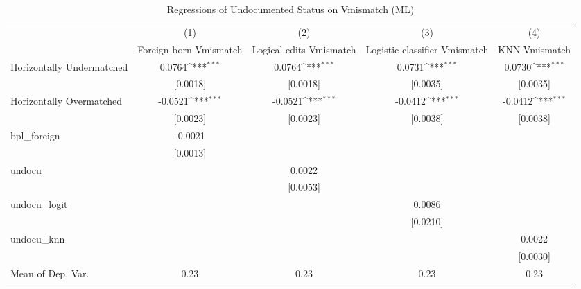 \begin{table}[htbp]\centering
\def\sym#1{\ifmmode^{#1}\else\(^{#1}\)\fi}
\caption{Regressions of Undocumented Status on Vmismatch (ML)}
\begin{tabular}{l*{4}{c}}
\toprule
                    &\multicolumn{1}{c}{(1)}         &\multicolumn{1}{c}{(2)}         &\multicolumn{1}{c}{(3)}         &\multicolumn{1}{c}{(4)}         \\
                    &Foreign-born Vmismatch         &Logical edits Vmismatch         &Logistic classifier Vmismatch         &KNN Vmismatch         \\
\midrule
Horizontally Undermatched&      0.0764\sym{***}&      0.0764\sym{***}&      0.0731\sym{***}&      0.0730\sym{***}\\
                    &    [0.0018]         &    [0.0018]         &    [0.0035]         &    [0.0035]         \\
\addlinespace
Horizontally Overmatched&     -0.0521\sym{***}&     -0.0521\sym{***}&     -0.0412\sym{***}&     -0.0412\sym{***}\\
                    &    [0.0023]         &    [0.0023]         &    [0.0038]         &    [0.0038]         \\
\addlinespace
bpl\_foreign         &     -0.0021         &                     &                     &                     \\
                    &    [0.0013]         &                     &                     &                     \\
\addlinespace
undocu              &                     &      0.0022         &                     &                     \\
                    &                     &    [0.0053]         &                     &                     \\
\addlinespace
undocu\_logit        &                     &                     &      0.0086         &                     \\
                    &                     &                     &    [0.0210]         &                     \\
\addlinespace
undocu\_knn          &                     &                     &                     &      0.0022         \\
                    &                     &                     &                     &    [0.0030]         \\
\midrule
Mean of Dep. Var.   &        0.23         &        0.23         &        0.23         &        0.23         \\

\end{tabular}
\end{table}
